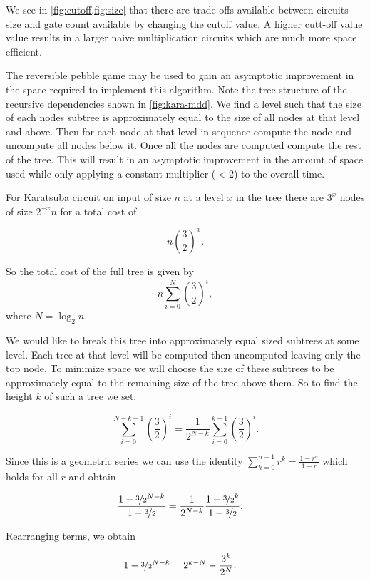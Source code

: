 We see in \cref{fig:cutoff,fig:size} that there are trade-offs available
between circuits size and gate count available by changing the cutoff
value. A higher cutt-off value value results in a larger naive
multiplication circuits which are much more space efficient.

The reversible pebble game may be used to gain an asymptotic improvement
in the space required to implement this algorithm. Note the tree structure of
the recursive dependencies shown in \cref{fig:kara-mdd}.  We find a level such
that the size of each nodes subtree is approximately equal to the size of all
nodes at that level and above. Then for each node at that level in sequence
compute the node and uncompute all nodes below it. Once all the nodes are
computed compute the rest of the tree.  This will result in an asymptotic
improvement in the amount of space used while only applying a constant
multiplier ($<2$) to the overall time.


For Karatsuba circuit on input of size $n$ at a level $x$ in the tree there are
$3^x$ nodes of size $2^{-x}n$ for a total cost of

\[
n\left(\frac{3}{2}\right)^x.
\]

So the total cost of the full tree is given by
\[
    n\sum_{i=0}^{N} \left(\frac{3}{2}\right)^i,
\]
where $N=\log_2 n$.

We would like to break this tree into approximately equal sized subtrees at
some level.  Each tree at that level will be computed then uncomputed leaving
only the top node. To minimize space we will choose the size of these subtrees
to be approximately equal to the remaining size of the tree above them.  So to
find the height $k$ of such a tree we set:

\[
    \sum_{i=0}^{N-k-1} \left(\frac{3}{2}\right)^i = \frac{1}{2^{N-k}}\sum_{i=0}^{k-1} \left(\frac{3}{2}\right)^i.
\]

Since this is a geometric series we can use the identity $\sum_{k=0}^{n-1} r^k
= \frac{1-r^n}{1-r}$ which holds for all $r$ and obtain

\begin{align*}
    \frac{1- \nicefrac{3}{2}^{N-k}}{1 - \nicefrac{3}{2}} &= \frac{1}{2^{N-k}}\frac{1- \nicefrac{3}{2}^{k}}{1 - \nicefrac{3}{2}}.
\end{align*}

Rearranging terms, we obtain

\begin{align*}
    1- \nicefrac{3}{2}^{N-k} &= 2^{k-N} - \frac{3^k}{2^N}.
\end{align*}

